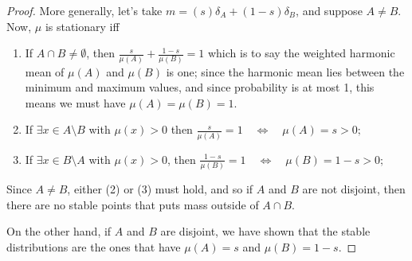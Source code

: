 \documentclass{article}
\begin{document}
\begin{proof}
    More generally, let's take $m = (s)\delta_A + (1-s)\delta_B$, and suppose $A \ne B$.
    Now, $\mu$ is stationary iff
    \begin{enumerate}
        \item If $A \cap B \ne \emptyset$, then
        $\displaystyle 
            \frac{s}{\mu(A)} +  \frac{1-s}{\mu(B)} = 1
        $
        which is to say the weighted harmonic mean of $\mu(A)$ and $\mu(B)$ is one; since the harmonic mean lies between the minimum and maximum values, and since probability is at most 1, this means we must have $\mu(A) = \mu(B) = 1$.
        
        \item If $\exists x \in A \setminus B$ with $\mu(x) > 0$ then 
        $\displaystyle
            \frac{s}{\mu(A)} = 1 \quad \iff\quad \mu(A) = s > 0;
        $

        \item If $\exists x \in B \setminus A$ with $\mu(x) >0$, then 
        $\displaystyle
            \frac{1-s}{\mu(B)} = 1 \quad \iff\quad \mu(B) = 1-s >0;
        $
    \end{enumerate}
    Since $A \ne B$, either (2) or (3) must hold, and so if $A$ and $B$ are not disjoint, then there are no stable points that puts mass outside of $A \cap B$. 
        
    On the other hand, if $A$ and $B$ are disjoint, we have shown that the stable distributions are the ones that have $\mu(A) = s$  and $\mu(B) = 1-s$.  
    

\end{proof}
\end{document}
